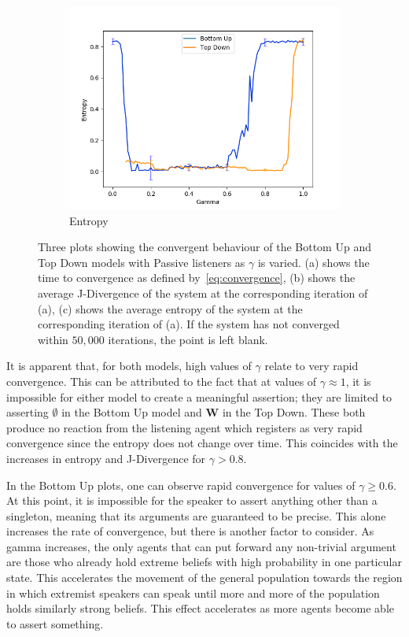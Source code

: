 \begin{figure}[H]
\begin{subfigure}[ht]{0.45\textwidth}
    \includegraphics[width=\textwidth]{Images/Figures/BU+TD/None/Entropy_best.png}
    \caption{Entropy}\label{fig:entropy_convergence}
 \end{subfigure}
 \caption{ Three plots showing the convergent behaviour of the Bottom Up and Top Down models with Passive listeners as $\gamma$ is varied. (a) shows the time to convergence as defined by~\cref{eq:convergence}, (b) shows the average J-Divergence of the system at the corresponding iteration of (a), (c) shows the average entropy of the system at the corresponding iteration of (a). If the system has not converged within $50,000$ iterations, the point is left blank. }\label{fig:convergence_none}
\end{figure}

It is apparent that, for both models, high values of $\gamma$ relate to very rapid convergence. This can be attributed to the fact that at values of $\gamma \approx 1$, it is impossible for either model to create a meaningful assertion; they are limited to asserting $\emptyset$ in the Bottom Up model and $\mathbf{W}$ in the Top Down.  These both produce no reaction from the listening agent which registers as very rapid convergence since the entropy does not change over time. This coincides with the increases in entropy and J-Divergence for $\gamma > 0.8$.

In the Bottom Up plots, one can observe rapid convergence for values of $\gamma \geq 0.6$. At this point, it is impossible for the speaker to assert anything other than a singleton, meaning that its arguments are guaranteed to be precise. This alone increases the rate of convergence, but there is another factor to consider. As gamma increases, the only agents that can put forward any non-trivial argument are those who already hold extreme beliefs with high probability in one particular state. This accelerates the movement of the general population towards the region in which extremist speakers can speak until more and more of the population holds similarly strong beliefs. This effect accelerates as more agents become able to assert something. 

